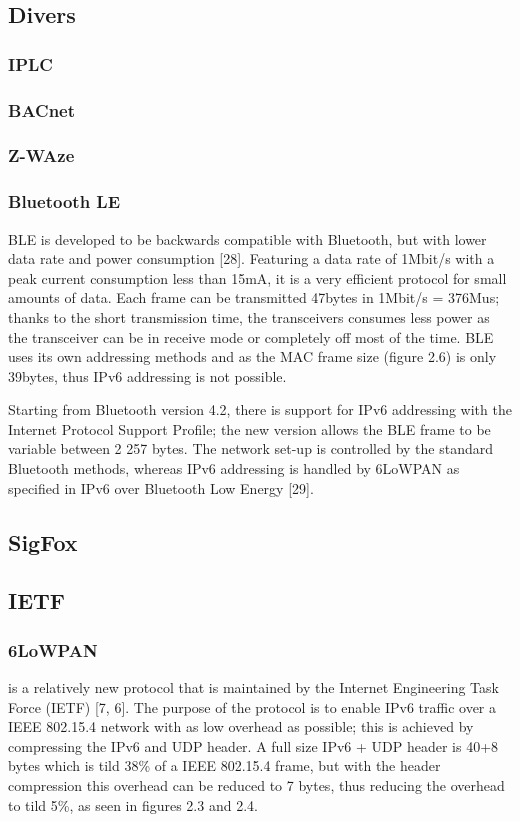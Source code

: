 \subsection{Divers}
\subsubsection{IPLC}
\subsubsection{BACnet}
\subsubsection{Z-WAze}
\subsubsection{Bluetooth LE}
BLE is developed to be backwards compatible with Bluetooth,
	but with lower data rate and power consumption [28].
Featuring a data rate of 1Mbit/s with a peak current consumption less than 15mA,
	it is a very efficient protocol for small amounts of data.
Each frame can be transmitted 47bytes in 1Mbit/s = 376Mus;
	thanks to the short transmission time,
	the transceivers consumes less power as the transceiver can be in receive mode or completely off most of the time.
BLE uses its own addressing methods and as the MAC frame size (figure 2.6) is only 39bytes,
	thus IPv6 addressing is not possible.

Starting from Bluetooth version 4.2,
	there is support for IPv6 addressing with the Internet Protocol Support Profile;
	the new version allows the BLE frame to be variable between 2 257 bytes.
The network set-up is controlled by the standard Bluetooth methods,
	whereas IPv6 addressing is handled by 6LoWPAN as specified in IPv6 over Bluetooth Low Energy [29].


\subsection{SigFox}

\subsection{IETF}
\subsubsection{6LoWPAN} 
is a relatively new protocol that is maintained by the Internet
Engineering Task Force (IETF) [7, 6].
The purpose of the protocol is to enable IPv6 traffic over a IEEE 802.15.4 network with as low overhead as possible;
	this is achieved by compressing the IPv6 and UDP header.
A full size IPv6 + UDP header is 40+8 bytes which is tild 38\% of a IEEE 802.15.4
frame,
	but with the header compression this overhead can be reduced to 7 bytes,
	thus reducing the overhead to tild 5\%,
	as seen in figures 2.3 and 2.4.



